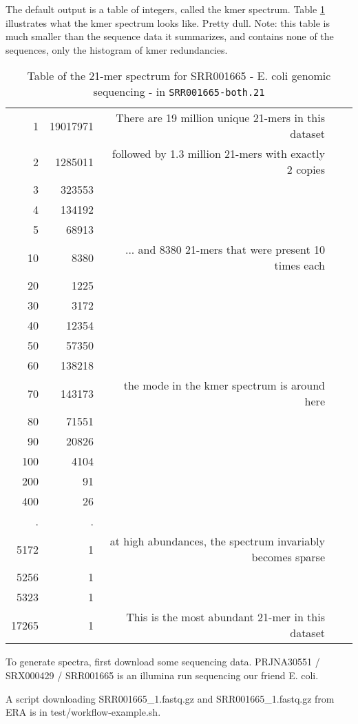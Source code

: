 \documentclass[11pt,fullpage]{article}
\begin{document}
The default output is a table of 
integers, called the kmer spectrum.  Table \ref{kmerspectrum} illustrates what the kmer spectrum
looks like.  Pretty dull.   Note: this table is much smaller than the sequence data it summarizes,
and contains none of the sequences, only the histogram of kmer redundancies.  

\begin{table}
\begin{tabular}{rrrrr}
1 & 19017971 & There are 19 million unique 21-mers in this dataset \\
2 & 1285011  & followed by 1.3 million 21-mers with exactly 2 copies \\
3 & 323553  \\
4 & 134192  \\
5 & 68913  \\
10 & 8380  & ... and 8380 21-mers that were present 10 times each \\
20 & 1225  \\
30 & 3172  \\
40 & 12354  \\
50 & 57350  \\
60 & 138218 & \\
70 & 143173 & the mode in the kmer spectrum is around here \\
80 & 71551  \\
90 & 20826  \\
100 & 4104  \\
200 & 91  \\
400 & 26  \\
. & . \\
5172 & 1 & at high abundances, the spectrum invariably becomes sparse \\
5256 & 1  \\
5323 & 1  \\
17265 & 1 &  This is the most abundant 21-mer in this dataset \\
\end{tabular}
\caption{Table of the 21-mer spectrum for SRR001665 - E. coli genomic sequencing - in \texttt{SRR001665-both.21} }
\label{kmerspectrum}
\end{table}

To generate spectra, first download some sequencing data.  
PRJNA30551 / SRX000429 / SRR001665  is an illumina run sequencing our friend E. coli.

A script downloading SRR001665\_1.fastq.gz and SRR001665\_1.fastq.gz from ERA is in test/workflow-example.sh.
\end{document}
